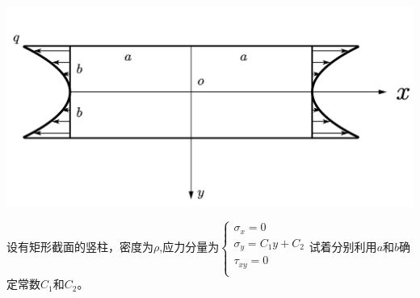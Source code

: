 \begin{example}
\end{example}
\centerline{\includegraphics[scale=0.5]{figure/2-4.png}}

\begin{example}
设有矩形截面的竖柱，密度为$\rho$,应力分量为$\begin{cases}
\sigma _x=0\\
\sigma _y=C_1y+C_2\\
\tau _{xy}=0\\
\end{cases}$试着分别利用$a$和$b$确定常数$C_1$和$C_2$。
\end{example}
